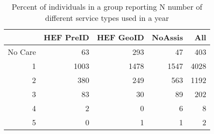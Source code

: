 \begin{table}[ht]
\centering
\begin{tabular}{rrrrr}
  \hline
 & HEF PreID & HEF GeoID & NoAssis & All \\ 
  \hline
No Care &  63 & 293 &  47 & 403 \\ 
  1 & 1003 & 1478 & 1547 & 4028 \\ 
  2 & 380 & 249 & 563 & 1192 \\ 
  3 &  83 &  30 &  89 & 202 \\ 
  4 &   2 &   0 &   6 &   8 \\ 
  5 &   0 &   1 &   1 &   2 \\ 
   \hline
\end{tabular}
\caption{Percent of individuals in a group reporting N number of different service types used in a year} 
\end{table}
